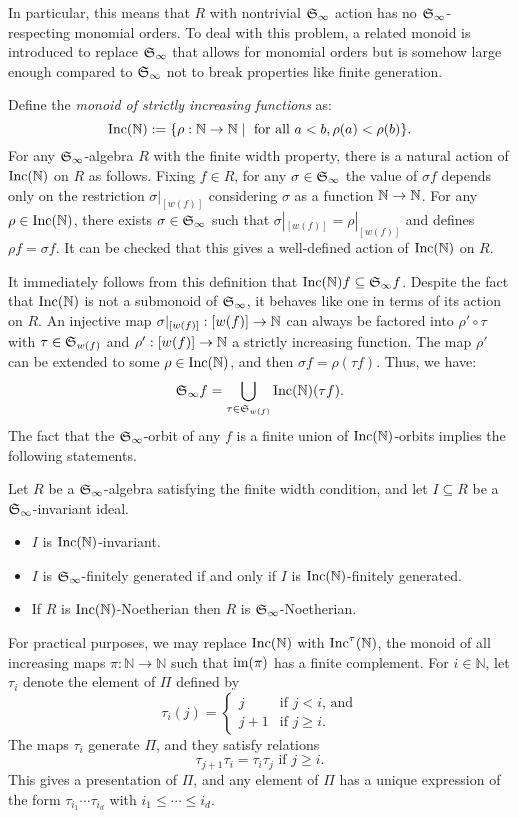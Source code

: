 In particular, this means that $R$ with nontrivial $\mathfrak S_\infty$ action has no $\mathfrak S_\infty$-respecting monomial orders.  To deal with this problem, a related monoid is introduced to replace $\mathfrak S_\infty$ that allows for monomial orders but is somehow large enough compared to $\mathfrak S_\infty$ not to break properties like finite generation.

Define the {\em monoid of strictly increasing functions} as:
\[ \operatorname{Inc}(\mathbb N) := \{ \rho:\mathbb N \to \mathbb N \mid \text{ for all } a < b, \rho(a) < \rho(b) \}. \]
For any $\mathfrak S_\infty$-algebra $R$ with the finite width property, there is a natural action of $\operatorname{Inc}(\mathbb N)$ on $R$ as follows.  Fixing $f \in R$, for any $\sigma \in \mathfrak S_\infty$ the value of $\sigma f$ depends only on the restriction $\sigma|_{[w(f)]}$ considering $\sigma$ as a function $\mathbb N \to \mathbb N$.  For any $\rho \in \operatorname{Inc}(\mathbb N)$, there exists $\sigma \in \mathfrak S_\infty$ such that $\sigma|_{[w(f)]} = \rho|_{[w(f)]}$ and defines $\rho f = \sigma f$.  It can be checked that this gives a well-defined action of $\operatorname{Inc}(\mathbb N)$ on $R$.

It immediately follows from this definition that $\operatorname{Inc}(\mathbb N) f \subseteq \mathfrak S_\infty f$.  Despite the fact that $\operatorname{Inc}(\mathbb N)$ is not a submonoid of $\mathfrak S_\infty$, it behaves like one in terms of its action on $R$.  An injective map $\sigma|_{[w(f)]}: [w(f)] \to \mathbb N$ can always be factored into $\rho' \circ \tau$ with $\tau \in \mathfrak S_{w(f)}$ and $\rho':[w(f)] \to \mathbb N$ a strictly increasing function.  The map $\rho'$ can be extended to some $\rho \in \operatorname{Inc}(\mathbb N)$, and then $\sigma f = \rho (\tau f)$.  Thus, we have:
 \[ \mathfrak S_\infty f = \bigcup_{\tau \in \mathfrak S_{w(f)}} \operatorname{Inc}(\mathbb N)(\tau f). \]
The fact that the $\mathfrak S_\infty$-orbit of any $f$ is a finite union of $\operatorname{Inc}(\mathbb N)$-orbits implies the following statements.

\begin{proposition}
 Let $R$ be a $\mathfrak S_\infty$-algebra satisfying the finite width condition, and let $I\subseteq R$ be a $\mathfrak S_\infty$-invariant ideal.
 \begin{itemize}
  \item $I$ is $\operatorname{Inc}(\mathbb N)$-invariant.
  \item $I$ is $\mathfrak S_\infty$-finitely generated if and only if $I$ is $\operatorname{Inc}(\mathbb N)$-finitely generated.
  \item If $R$ is $\operatorname{Inc}(\mathbb N)$-Noetherian then $R$ is $\mathfrak S_\infty$-Noetherian.
 \end{itemize}
\end{proposition}

\begin{remark}\label{rem:IncT}
For practical purposes, we may replace $\operatorname{Inc}(\mathbb N)$ with $\operatorname{Inc}^\tau(\mathbb N)$, the monoid of all increasing maps
$\pi:\mathbb N \to \mathbb N$ such that $\operatorname{im}(\pi)$ has a finite complement. 
For $i \in \mathbb N$, let $\tau_i$ denote the element of $\Pi$ defined by
\[ \tau_i(j)=
\begin{cases} 
	j & \text{if $j<i$, and}\\
	j+1 & \text{if $j \geq i$.}
\end{cases}
\]
The maps $\tau_i$ generate $\Pi$, and they satisfy relations
\[ \tau_{j+1}\tau_i=\tau_i \tau_j \text{ if }j \geq i. \]
This gives a presentation of $\Pi$, and any element of $\Pi$
has a unique expression of the form $\tau_{i_1} \cdots \tau_{i_d}$
with $i_1 \leq \cdots \leq i_d$.
\end{remark}

